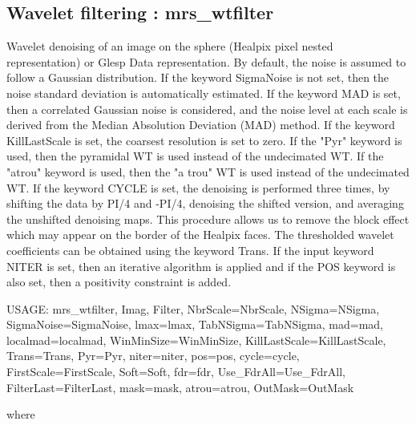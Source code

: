 \subsection{Wavelet filtering : mrs\_wtfilter}
Wavelet denoising of an image on the sphere (Healpix pixel nested representation) or Glesp Data representation. By default, 
the noise is assumed to follow a Gaussian distribution. If the keyword SigmaNoise is not set, then the noise standard deviation 
is automatically estimated. If the keyword MAD is set, then a correlated Gaussian noise is considered, and the noise level at 
each scale is derived from the Median Absolution Deviation (MAD) method. If the keyword KillLastScale is set, the coarsest 
resolution is set to zero. If the "Pyr" keyword is used, then the pyramidal WT is used instead of the undecimated WT. 
If the "atrou" keyword is used, then the "a trou" WT is used instead of the undecimated WT. If the keyword CYCLE is set, 
the denoising is performed three times, by shifting the data by PI/4 and -PI/4, denoising the shifted version, and averaging 
the unshifted denoising maps. This procedure allows us to remove the block effect which may appear on the border of the Healpix faces. 
The thresholded wavelet coefficients can be obtained using the keyword Trans. If the input keyword NITER is set, then an iterative 
algorithm is applied and if the POS keyword is also set, then a positivity constraint is added.
{\bf
\begin{center}
     USAGE:  mrs\_wtfilter, Imag, Filter, NbrScale=NbrScale, NSigma=NSigma, SigmaNoise=SigmaNoise, lmax=lmax, TabNSigma=TabNSigma, mad=mad, 
     localmad=localmad, WinMinSize=WinMinSize, KillLastScale=KillLastScale, Trans=Trans, Pyr=Pyr, niter=niter, pos=pos, cycle=cycle, 
     FirstScale=FirstScale, Soft=Soft, fdr=fdr, Use\_FdrAll=Use\_FdrAll, FilterLast=FilterLast, mask=mask, atrou=atrou, OutMask=OutMask 
\end{center}}
where
